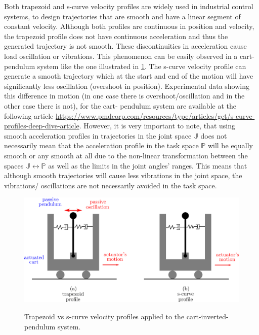 Both trapezoid and s-curve velocity profiles are widely used in industrial control systems, to design trajectories that are smooth and have a linear segment of constant velocity. Although both profiles are continuous in
position and velocity, the trapezoid profile does not have continuous acceleration and thus the generated trajectory is not smooth. These discontinuities in acceleration cause load oscillation or vibrations. This 
phenomenon can be easily observed in a cart-pendulum system like the one illustrated in \ref{cart-pendulum-passive-wrist-analogy}. The s-curve velocity profile can generate a smooth trajectory which at the start and end of 
the motion will have significantly less oscillation (overshoot in position). Experimental data showing this difference in motion (in one case there is overshoot/oscillation and in the other case there is not), for the cart-
pendulum system are available at the following article \url{https://www.pmdcorp.com/resources/type/articles/get/s-curve-profiles-deep-dive-article}. However, it is very important to note, that using smooth acceleration 
profiles in trajectories in the joint space $\mathbb{J}$ does not necessarily mean that the acceleration profile in the task space $\mathbb{P}$ will be equally smooth or any smooth at all due to the non-linear transformation 
between the spaces $\mathbb{J} \longleftrightarrow \mathbb{P}$ as well as the limits in the joint angles' ranges. This means that although smooth trajectories will cause less vibrations in the joint space, the vibrations/
oscillations are not necessarily avoided in the task space.

\begin{center}
\begin{figure}[htbp]
\centering
\includegraphics[width=\textwidth]{images/cart-pendulum-passive-wrist-analogy.png}\\
\caption{Trapezoid vs s-curve velocity profiles applied to the cart-inverted-pendulum system.} 
\label{cart-pendulum-passive-wrist-analogy}
\end{figure}
\end{center}

